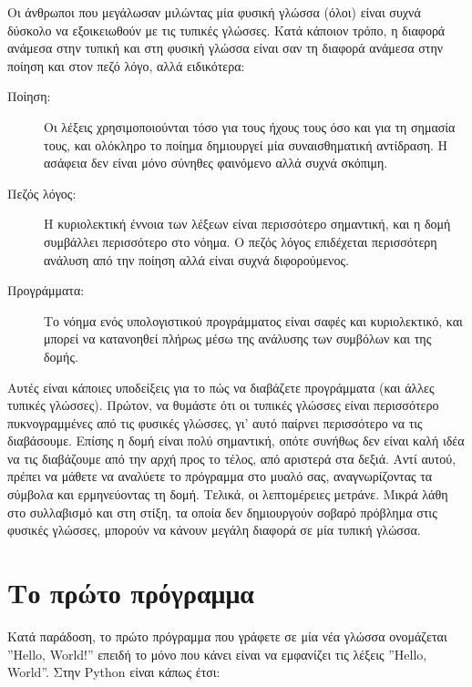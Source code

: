 \documentclass[10pt]{book}
\begin{document}
Οι άνθρωποι που μεγάλωσαν μιλώντας μία φυσική γλώσσα (όλοι) είναι
συχνά δύσκολο να εξοικειωθούν με τις τυπικές γλώσσες.  Κατά κάποιον τρόπο,
η διαφορά ανάμεσα στην τυπική και στη φυσική γλώσσα είναι σαν τη διαφορά
ανάμεσα στην ποίηση και στον πεζό λόγο, αλλά ειδικότερα:

\begin{description}

\item[Ποίηση:] Οι λέξεις χρησιμοποιούνται τόσο για τους ήχους τους
όσο και για τη σημασία τους, και ολόκληρο το ποίημα δημιουργεί μία
συναισθηματική αντίδραση.  Η ασάφεια δεν είναι μόνο σύνηθες φαινόμενο
αλλά συχνά σκόπιμη.

\item[Πεζός λόγος:] Η κυριολεκτική έννοια των λέξεων είναι περισσότερο
σημαντική, και η δομή συμβάλλει περισσότερο στο νόημα.  Ο πεζός λόγος
επιδέχεται περισσότερη ανάλυση από την ποίηση αλλά είναι συχνά
διφορούμενος.

\item[Προγράμματα:] Το νόημα ενός υπολογιστικού προγράμματος είναι
σαφές και κυριολεκτικό, και μπορεί να κατανοηθεί πλήρως μέσω της ανάλυσης
των συμβόλων και της δομής.

\end{description}

Αυτές είναι κάποιες υποδείξεις για το πώς να διαβάζετε προγράμματα (και άλλες
τυπικές γλώσσες).  Πρώτον, να θυμάστε ότι οι τυπικές γλώσσες είναι
περισσότερο πυκνογραμμένες από τις φυσικές γλώσσες, γι' αυτό παίρνει
περισσότερο να τις διαβάσουμε.  Επίσης η δομή είναι πολύ σημαντική,
οπότε συνήθως δεν είναι καλή ιδέα να τις διαβάζουμε από την αρχή προς
το τέλος, από αριστερά στα δεξιά.  Αντί αυτού, πρέπει να μάθετε να αναλύετε
το πρόγραμμα στο μυαλό σας, αναγνωρίζοντας τα σύμβολα και ερμηνεύοντας
τη δομή.  Τελικά, οι λεπτομέρειες μετράνε.  Μικρά λάθη στο συλλαβισμό και
στη στίξη, τα οποία δεν δημιουργούν σοβαρό πρόβλημα στις φυσικές γλώσσες,
μπορούν να κάνουν μεγάλη διαφορά σε μία τυπική γλώσσα.


\section{Το πρώτο πρόγραμμα}
\label{hello}

Κατά παράδοση, το πρώτο πρόγραμμα που γράφετε σε μία νέα
γλώσσα ονομάζεται ''Hello, World!'' επειδή το μόνο που κάνει
είναι να εμφανίζει τις λέξεις ''Hello, World''. Στην Python
είναι κάπως έτσι:
\end{document}
